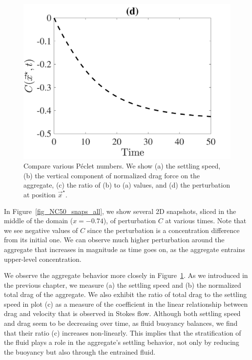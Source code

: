 \begin{figure}[h]
\begin{center}
		\includegraphics[scale=0.35]{./figures/fig_NC50_bs_C_star}
	\caption{Compare various Péclet numbers. We show (a) the settling speed, (b) the vertical component of normalized drag force on the aggregate, (c) the ratio of (b) to (a) values, and (d) the perturbation at position $\vec{x}^{\star}$. }
	\label{fig_NC50_base_case_all}
\end{center}
\end{figure}
\par 
In Figure~\ref{fig_NC50_snaps_all}, we show several 2D snapshots, sliced in the middle of the domain ($x = -0.74$), of perturbation $C$ at various times. Note that we see negative values of $C$ since the perturbation is a concentration difference from its initial one. 
We can observe much higher perturbation around the aggregate that increases in magnitude as time goes on, as the aggregate entrains upper-level concentration. 
\par
We observe the aggregate behavior more closely in Figure~\ref{fig_NC50_base_case_all}. As we introduced in the previous chapter, we measure (a) the settling speed and (b) the normalized total drag of the aggregate. We also exhibit the ratio of total drag to the settling speed in plot (c) as a measure of the coefficient in the linear relationship between drag and velocity
that is observed in Stokes flow. Although both settling speed and drag seem to be decreasing over time, as fluid buoyancy balances, we find that their ratio (c) increases non-linearly. This implies that the stratification of the fluid plays a role in the aggregate's settling behavior, not only by reducing the buoyancy but also through the entrained fluid. 
